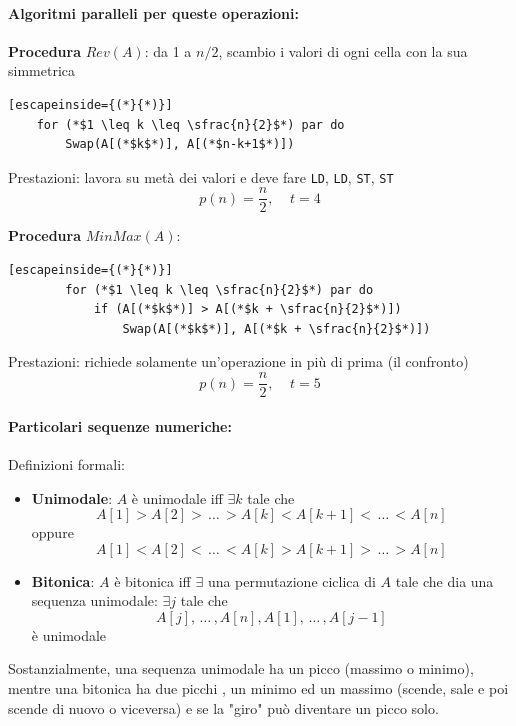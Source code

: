 \documentclass[11pt]{article}
\begin{document}
	\newpage
	
	
	\paragraph{Algoritmi paralleli per queste operazioni: }
	\item \textbf{Procedura} $Rev(A)$: da 1 a $n/2$, scambio i valori di ogni cella con la sua simmetrica
	\begin{lstlisting}[escapeinside={(*}{*)}]
	for (*$1 \leq k \leq \sfrac{n}{2}$*) par do
		Swap(A[(*$k$*)], A[(*$n-k+1$*)])
	\end{lstlisting}
	Prestazioni: lavora su metà dei valori e deve fare \texttt{LD}, \texttt{LD}, \texttt{ST}, \texttt{ST}
	$$ p(n) = \frac{n}{2}, \;\;\;\; t = 4 $$
	
	\item \textbf{Procedura} $MinMax(A)$:
	\begin{lstlisting}[escapeinside={(*}{*)}]
		for (*$1 \leq k \leq \sfrac{n}{2}$*) par do
			if (A[(*$k$*)] > A[(*$k + \sfrac{n}{2}$*)])
				Swap(A[(*$k$*)], A[(*$k + \sfrac{n}{2}$*)])
	\end{lstlisting}
	Prestazioni: richiede solamente un'operazione in più di prima (il confronto)
	$$ p(n) = \frac{n}{2}, \;\;\;\; t = 5 $$
	
	\paragraph{Particolari sequenze numeriche:} Definizioni formali: 
	\begin{itemize}
		\item \textbf{Unimodale}: $A$ è unimodale iff $\exists k$ tale che 
		$$ A[1] > A[2] > \, \dots \, > A[k] < A[k+1] < \, \dots \, < A[n] $$
		oppure 
		$$ A[1] < A[2] < \, \dots \, < A[k] > A[k+1] > \, \dots \, > A[n] $$
		
		\item \textbf{Bitonica}: $A$ è bitonica iff $\exists$ una permutazione ciclica di $A$ tale che dia una sequenza unimodale: $\exists j$ tale che
		$$ A[j], \, \dots \, , A[n], A[1], \, \dots \, , A[j-1] $$ 
		è unimodale
	\end{itemize}
	Sostanzialmente, una sequenza unimodale ha un picco (massimo o minimo), mentre una bitonica ha due picchi , un minimo ed un massimo (scende, sale e poi scende di nuovo o viceversa) e se la "giro" può diventare un picco solo. \\
	
\end{document}
